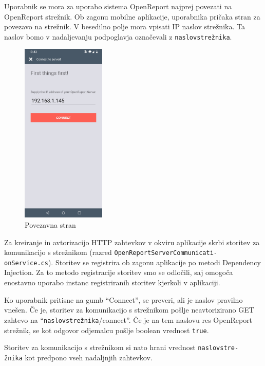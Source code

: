 \documentclass[a4paper, 12pt]{book}
\begin{document}
Uporabnik se mora za uporabo sistema OpenReport najprej povezati na OpenReport strežnik.
Ob zagonu mobilne aplikacije, uporabnika pričaka stran za povezavo na strežnik.
V besedilno polje mora vpisati IP naslov strežnika.
Ta naslov bomo v nadaljevanju podpoglavja označevali z \texttt{naslovstrežnika}.


\begin{figure}[H]
\begin{center}
\includegraphics[width=4cm]{app_connect}
\end{center}
\caption{Povezavna stran}
\label{app_connect}
\end{figure}


Za kreiranje in avtorizacijo HTTP zahtevkov v okviru aplikacije skrbi storitev za komunikacijo s strežnikom (razred \texttt{OpenReportServerCommunicati-\\onService.cs}).
Storitev se registrira ob zagonu aplikacije po metodi Dependency Injection.
Za to metodo registracije storitev smo se odločili, saj omogoča enostavno uporabo instanc registriranih storitev kjerkoli v aplikaciji.

Ko uporabnik pritisne na gumb \enquote{Connect}, se preveri, ali je naslov pravilno vnešen.
Če je, storitev za komunikacijo s strežnikom pošlje neavtorizirano GET zahtevo na \enquote{\texttt{naslovstrežnika}/connect}. 
Če je na tem naslovu res OpenReport strežnik, se kot odgovor odjemalcu pošlje boolean vrednost \texttt{true}.

Storitev za komunikacijo s strežnikom si nato hrani vrednost \texttt{naslovstre-\\žnika} kot predpono vseh nadaljnjih zahtevkov.
\end{document}
